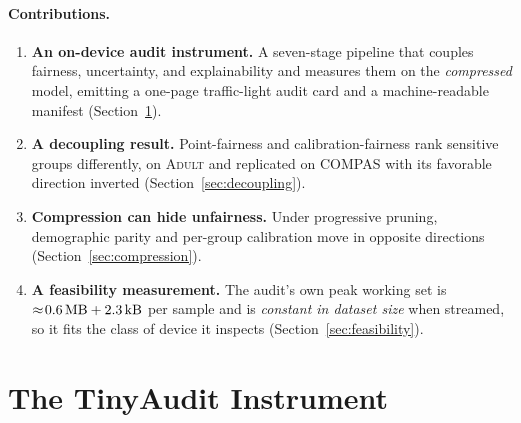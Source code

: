 \documentclass[11pt]{article}
\newcommand{\dataset}[1]{\textsc{#1}}
\begin{document}
\paragraph{Contributions.}
\begin{enumerate}
    \item \textbf{An on-device audit instrument.} A seven-stage pipeline that
    couples fairness, uncertainty, and explainability and measures them on the
    \emph{compressed} model, emitting a one-page traffic-light audit card and a
    machine-readable manifest (Section~\ref{sec:instrument}).
    \item \textbf{A decoupling result.} Point-fairness and calibration-fairness
    rank sensitive groups differently, on \dataset{Adult} and replicated on
    \dataset{COMPAS} with its favorable direction inverted
    (Section~\ref{sec:decoupling}).
    \item \textbf{Compression can hide unfairness.} Under progressive pruning,
    demographic parity and per-group calibration move in opposite directions
    (Section~\ref{sec:compression}).
    \item \textbf{A feasibility measurement.} The audit's own peak working set is
    $\approx\!\SI{0.6}{\mega\byte} + \SI{2.3}{\kilo\byte}$ per sample and is
    \emph{constant in dataset size} when streamed, so it fits the class of device
    it inspects (Section~\ref{sec:feasibility}).
\end{enumerate}

\section{The TinyAudit Instrument}
\label{sec:instrument}
\end{document}
